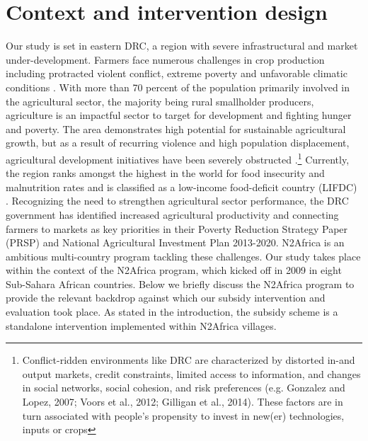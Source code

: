\section{Context and intervention design}
Our study is set in eastern DRC, a region with severe infrastructural and market under-development. Farmers face numerous challenges in crop production including protracted violent conflict, extreme poverty and unfavorable climatic conditions \citep{Vlassenroot2005a,Ansoms2009}. With more than 70 percent of the population primarily involved in the agricultural sector, the majority being rural smallholder producers, agriculture is an impactful sector to target for development and fighting hunger and poverty. The area demonstrates high potential for sustainable agricultural growth, but as a result of recurring violence and high population displacement, agricultural development initiatives have been severely obstructed \citep{Vlassenroot2005a}.\footnote{Conflict-ridden environments like DRC are characterized by distorted in-and output markets, credit constraints, limited access to information, and changes in social networks, social cohesion, and risk preferences (e.g. Gonzalez and Lopez, 2007; Voors et al., 2012; Gilligan et al., 2014). These factors are in turn associated with people’s propensity to invest in new(er) technologies, inputs or crops} Currently, the region ranks amongst the highest in the world for food insecurity and malnutrition rates and is classified as a low-income food-deficit country (LIFDC) \citep{Lambrecht2016,Vanlauwe2019,WFP2014,Development2015}. Recognizing the need to strengthen agricultural sector performance, the DRC government has identified increased agricultural productivity and connecting farmers to markets as key priorities in their Poverty Reduction Strategy Paper (PRSP) and National Agricultural Investment Plan 2013-2020. 
N2Africa is an ambitious multi-country program tackling these challenges. Our study takes place within the context of the N2Africa program, which kicked off in 2009 in eight Sub-Sahara African countries. Below we briefly discuss the N2Africa program to provide the relevant backdrop against which our subsidy intervention and evaluation took place. As stated in the introduction, the subsidy scheme is a standalone intervention implemented within N2Africa villages. 

